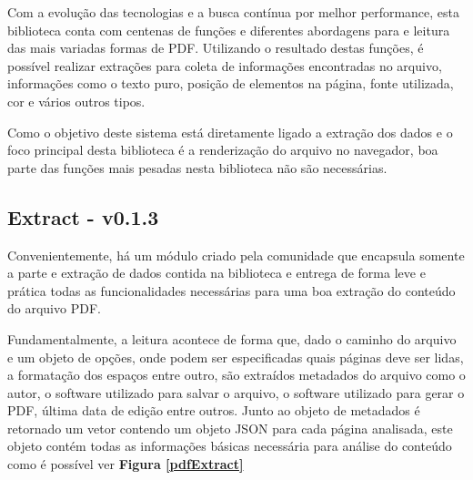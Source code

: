 Com a evolução das tecnologias e a busca contínua por melhor performance, esta biblioteca conta com centenas de funções e diferentes abordagens para e leitura das mais variadas formas de PDF. Utilizando o resultado destas funções, é possível realizar extrações para coleta de informações encontradas no arquivo, informações como o texto puro, posição de elementos na página, fonte utilizada, cor e vários outros tipos.

Como o objetivo deste sistema está diretamente ligado a extração dos dados e o foco principal desta biblioteca é a renderização do arquivo no navegador, boa parte das funções mais pesadas nesta biblioteca não são necessárias.

\subsection{Extract - v0.1.3}
Convenientemente, há um módulo criado pela comunidade que encapsula somente a parte e extração de dados contida na biblioteca e entrega de forma leve e prática todas as funcionalidades necessárias para uma boa extração do conteúdo do arquivo PDF.

Fundamentalmente, a leitura acontece de forma que, dado o caminho do arquivo e um objeto de opções, onde podem ser especificadas quais páginas deve ser lidas, a formatação dos espaços entre outro, são extraídos metadados do arquivo como o autor, o software utilizado para salvar o arquivo, o software utilizado para gerar o PDF, última data de edição entre outros. Junto ao objeto de metadados é retornado um vetor contendo um objeto JSON para cada página analisada, este objeto contém todas as informações básicas necessária para análise do conteúdo como é possível ver  \textbf{Figura \ref{pdfExtract}}

